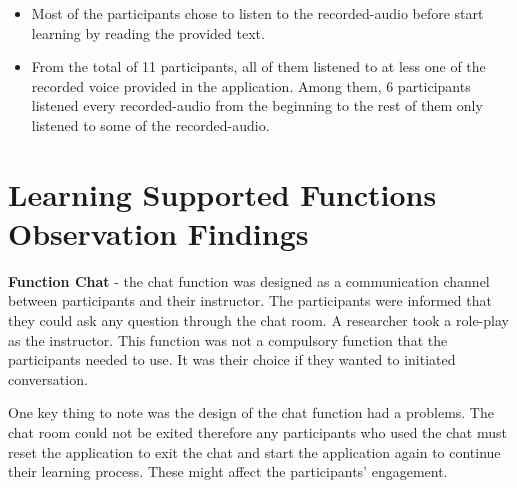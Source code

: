 \begin{itemize}
\item Most of the participants chose to listen to the recorded-audio before start learning by reading the provided text. 
\item From the total of 11 participants, all of them listened to at less one of the recorded voice provided in the application. Among them, 6 participants listened every recorded-audio from the beginning to the rest of them only listened to some of the recorded-audio. 
\end{itemize}



\section{Learning Supported Functions Observation Findings}

\textbf{Function Chat} - the chat function was designed as a communication channel between participants and their instructor. The participants were informed that they could ask any question through the chat room. A researcher took a role-play as the instructor. This function was not a compulsory function that the participants needed to use. It was their choice if they wanted to initiated conversation. 

One key thing to note was the design of the chat function had a problems. The chat room could not be exited therefore any participants who used the chat must reset the application to exit the chat and start the application again to continue their learning process. These might affect the participants' engagement. 

